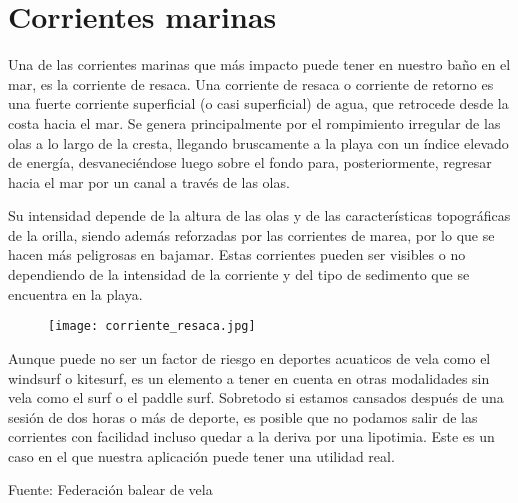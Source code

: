 \section{Corrientes marinas}

Una de las corrientes marinas que más impacto puede tener en nuestro baño en el mar, es la corriente de resaca. \cite{RESACA}
Una corriente de resaca o corriente de retorno es una fuerte corriente superficial (o casi superficial) de agua, que retrocede desde la costa hacia el mar. Se genera principalmente por el rompimiento irregular de las olas a lo largo de la cresta, llegando bruscamente a la playa con un índice elevado de energía, desvaneciéndose luego sobre el fondo para, posteriormente, regresar hacia el mar por un canal a través de las olas.

Su intensidad depende de la altura de las olas y de las características topográficas de la orilla, siendo además reforzadas por las corrientes de marea, por lo que se hacen más peligrosas en bajamar. Estas corrientes pueden ser visibles o no dependiendo de la intensidad de la corriente y del tipo de sedimento que se encuentra en la playa.

\begin{figure}[hb]
\texttt{[image: corriente\_resaca.jpg]} 
\end{figure}

Aunque puede no ser un factor de riesgo en deportes acuaticos de vela como el windsurf o kitesurf, es un elemento a tener en cuenta en otras modalidades sin vela como el surf o el paddle surf. Sobretodo si estamos cansados después de una sesión de dos horas o más de deporte, es posible que no podamos salir de las corrientes con facilidad incluso quedar a la deriva por una lipotimia. Este es un caso en el que nuestra aplicación puede tener una utilidad real.


Fuente: Federación balear de vela \cite{FBVELA} 